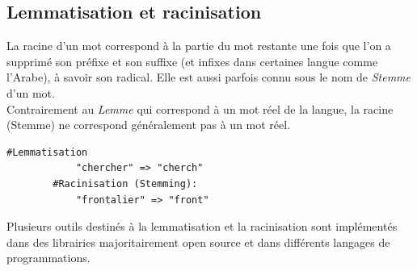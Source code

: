     \subsection{Lemmatisation et racinisation}
    La racine d'un mot correspond à la partie du mot restante une fois que l'on a supprimé son préfixe et son suffixe (et infixes dans certaines langue comme l'Arabe), à savoir son radical. Elle est aussi parfois connu sous le nom de \emph{Stemme} d'un mot.\\ 
    Contrairement au \emph{Lemme} qui correspond à un mot réel de la langue, la racine (Stemme) ne correspond généralement pas à un mot réel.
    \begin{lstlisting}[style=code]
        #Lemmatisation 
            "chercher" => "cherch"
        #Racinisation (Stemming):
            "frontalier" => "front"  
    \end{lstlisting}
    Plusieurs outils destinés à la lemmatisation et la racinisation sont implémentés dans des librairies majoritairement open source et dans différents langages de programmations.


